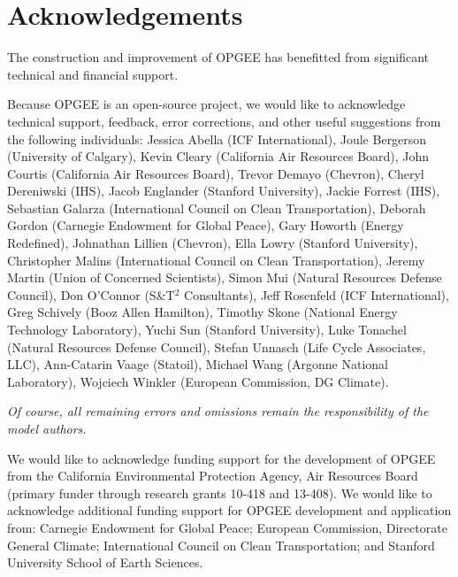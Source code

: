 \documentclass[11pt]{report}
\begin{document}
\clearpage

\tableofcontents

\clearpage 

\listoffigures

\clearpage

\listoftables

\clearpage




\chapter{Acknowledgements}

The construction and improvement of OPGEE has benefitted from significant technical and financial support.  

\vspace{0.2in}
Because OPGEE is an open-source project, we would like to acknowledge technical support, feedback, error corrections, and other useful suggestions from the following individuals: Jessica Abella (ICF International), Joule Bergerson (University of Calgary), Kevin Cleary (California Air Resources Board), John Courtis (California Air Resources Board), Trevor Demayo (Chevron), Cheryl Dereniwski (IHS), Jacob Englander (Stanford University), Jackie Forrest (IHS), Sebastian Galarza (International Council on Clean Transportation), Deborah Gordon (Carnegie Endowment for Global Peace), Gary Howorth (Energy Redefined), Johnathan Lillien (Chevron), Ella Lowry (Stanford University), Christopher Malins (International Council on Clean Transportation), Jeremy Martin (Union of Concerned Scientists), Simon Mui (Natural Resources Defense Council), Don O'Connor (S\&T$^2$ Consultants), Jeff Rosenfeld (ICF International), Greg Schively (Booz Allen Hamilton), Timothy Skone (National Energy Technology Laboratory), Yuchi Sun (Stanford University), Luke Tonachel (Natural Resources Defense Council), Stefan Unnasch (Life Cycle Associates, LLC), Ann-Catarin Vaage (Statoil), Michael Wang (Argonne National Laboratory), Wojciech Winkler (European Commission, DG Climate). 

\vspace{0.2in}
\emph{Of course, all remaining errors and omissions remain the responsibility of the model authors.}

\vspace{0.2in}
We would like to acknowledge funding support for the development of OPGEE from the California Environmental Protection Agency, Air Resources Board (primary funder through research grants 10-418 and 13-408). We would like to acknowledge additional funding support for OPGEE development and application from: Carnegie Endowment for Global Peace; European Commission, Directorate General Climate; International Council on Clean Transportation; and Stanford University School of Earth Sciences.
\end{document}
